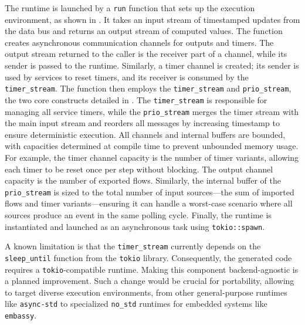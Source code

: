 The runtime is launched by a \texttt{run} function that sets up the execution environment,
as shown in . It takes an input stream of
timestamped updates from the data bus and returns an output stream of computed values.
%
The function creates asynchronous communication channels for outputs and timers. The
output stream returned to the caller is the receiver part of a channel, while its sender
is passed to the runtime. Similarly, a timer channel is created; its sender is used by
services to reset timers, and its receiver is consumed by the \texttt{timer\_stream}.
%
The function then employs the \texttt{timer\_stream} and \texttt{prio\_stream}, the two
core \GRust constructs detailed in . The
\texttt{timer\_stream} is responsible for managing all service timers, while the
\texttt{prio\_stream} merges the timer stream with the main input stream and reorders all
messages by increasing timestamp to ensure deterministic execution.
%
All channels and internal buffers are bounded, with capacities determined at compile
time to prevent unbounded memory usage. For example, the timer channel capacity is the
number of timer variants, allowing each timer to be reset once per step without
blocking. The output channel capacity is the number of exported flows. Similarly, the
internal buffer of the \texttt{prio\_stream} is sized to the total number of input
sources---the sum of imported flows and timer variants---ensuring it can handle a
worst-case scenario where all sources produce an event in the same polling cycle.
%
Finally, the runtime is instantiated and launched as an asynchronous task using
\texttt{tokio::spawn}.

A known limitation is that the \texttt{timer\_stream} currently depends on the
\texttt{sleep\_until} function from the \texttt{tokio} library. Consequently, the generated
code requires a \texttt{tokio}-compatible runtime. Making this component
backend-agnostic is a planned improvement. Such a change would be crucial for
portability, allowing \GRust to target diverse execution environments, from other
general-purpose runtimes like \texttt{async-std} to specialized \texttt{no\_std} runtimes
for embedded systems like \texttt{embassy}.

